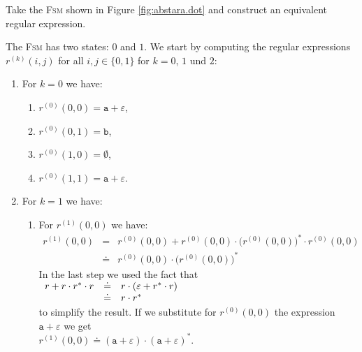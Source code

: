 \exerciseEng
Take the \textsc{Fsm} shown in Figure \ref{fig:abstara.dot} and construct an equivalent regular expression.


\solutionEng
The \textsc{Fsm} has two states: $0$ and $1$.  We start by computing the regular expressions
$r^{(k)}(i,j)$ for all $i,j\in\{0,1\}$ for  $k =0$, $1$ und $2$:
\begin{enumerate}
\item For $k = 0$ we have:
      \begin{enumerate}
      \item $r^{(0)}(0, 0) = \texttt{a} + \varepsilon$,
      \item $r^{(0)}(0, 1) = \texttt{b}$,
      \item $r^{(0)}(1, 0) = \emptyset$,
      \item $r^{(0)}(1, 1) = \texttt{a} + \varepsilon$.
      \end{enumerate}
\item For $k=1$ we have:
      \begin{enumerate}
      \item For $r^{(1)}(0, 0)$ we have:
            \begin{eqnarray*}
                  r^{(1)}(0, 0) 
            & = & r^{(0)}(0, 0) + 
                  r^{(0)}(0, 0) \cdot \bigl(r^{(0)}(0, 0)\bigr)^* \cdot r^{(0)}(0, 0) \\
            & \doteq & r^{(0)}(0, 0) \cdot \bigl(r^{(0)}(0, 0)\bigr)^*
            \end{eqnarray*}
             In the last step we used the fact that 
             \\[0.2cm]
             \hspace*{1.3cm}
             $
             \begin{array}[t]{lcl}
               r + r \cdot r^* \cdot r & \doteq & r \cdot (\varepsilon + r^* \cdot r) \\
                                       & \doteq & r \cdot r^*
             \end{array}
             $
             \\[0.2cm]
             to simplify the result.
             If we substitute for $r^{(0)}(0, 0)$ the expression $\texttt{a} + \varepsilon$  
             we get 
             \\[0.2cm]
             \hspace*{1.3cm}
             $r^{(1)}(0, 0) \doteq (\texttt{a} + \varepsilon)\cdot (\texttt{a} + \varepsilon)^*$.
             \\[0.2cm]

\end{enumerate}
\end{enumerate}
